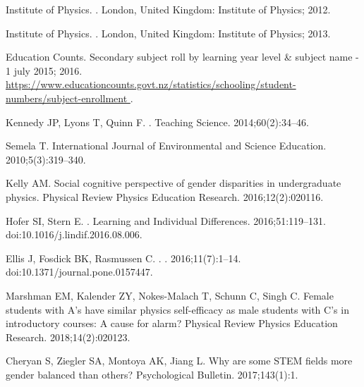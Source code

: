 \begin{thebibliography}{10}
{Institute of Physics}.
.
\newblock London, United Kingdom: Institute of Physics; 2012.

{Institute of Physics}.
.
\newblock London, United Kingdom: Institute of Physics; 2013.

{Education Counts}. Secondary subject roll by learning year level \& subject
  name - 1 july 2015; 2016.
\newblock
  \url{https://www.educationcounts.govt.nz/statistics/schooling/student-numbers/subject-enrollment
  }.

Kennedy JP, Lyons T, Quinn F.
.
\newblock Teaching Science. 2014;60(2):34--46.

Semela T.
\newblock International Journal of Environmental and Science Education.
  2010;5(3):319--340.

Kelly AM.
\newblock Social cognitive perspective of gender disparities in undergraduate
  physics.
\newblock Physical Review Physics Education Research. 2016;12(2):020116.

Hofer SI, Stern E.
.
\newblock Learning and Individual Differences. 2016;51:119--131.
\newblock doi:{10.1016/j.lindif.2016.08.006}.

Ellis J, Fosdick BK, Rasmussen C.
.
. 2016;11(7):1--14.
\newblock doi:{10.1371/journal.pone.0157447}.

Marshman EM, Kalender ZY, Nokes-Malach T, Schunn C, Singh C.
\newblock Female students with A's have similar physics self-efficacy as male students with C's in introductory courses: A cause for alarm?
\newblock Physical Review Physics Education Research. 2018;14(2):020123.

Cheryan S, Ziegler SA, Montoya AK, Jiang L.
\newblock Why are some STEM fields more gender balanced than others?
\newblock Psychological Bulletin. 2017;143(1):1.


\end{thebibliography}
